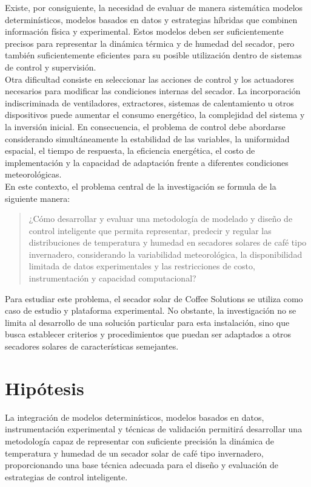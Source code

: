 Existe, por consiguiente, la necesidad de evaluar de manera sistemática modelos determinísticos, modelos basados en datos y estrategias híbridas que combinen información física y experimental. Estos modelos deben ser suficientemente precisos para representar la dinámica térmica y de humedad del secador, pero también suficientemente eficientes para su posible utilización dentro de sistemas de control y supervisión.\\

Otra dificultad consiste en seleccionar las acciones de control y los actuadores necesarios para modificar las condiciones internas del secador. La incorporación indiscriminada de ventiladores, extractores, sistemas de calentamiento u otros dispositivos puede aumentar el consumo energético, la complejidad del sistema y la inversión inicial. En consecuencia, el problema de control debe abordarse considerando simultáneamente la estabilidad de las variables, la uniformidad espacial, el tiempo de respuesta, la eficiencia energética, el costo de implementación y la capacidad de adaptación frente a diferentes condiciones meteorológicas.\\

En este contexto, el problema central de la investigación se formula de la siguiente manera:
\begin{quote}
¿Cómo desarrollar y evaluar una metodología de modelado y diseño de control inteligente que permita representar, predecir y regular las distribuciones de temperatura y humedad en secadores solares de café tipo invernadero, considerando la variabilidad meteorológica, la disponibilidad limitada de datos experimentales y las restricciones de costo, instrumentación y capacidad computacional?
\end{quote}

Para estudiar este problema, el secador solar de Coffee Solutions se utiliza como caso de estudio y plataforma experimental. No obstante, la investigación no se limita al desarrollo de una solución particular para esta instalación, sino que busca establecer criterios y procedimientos que puedan ser adaptados a otros secadores solares de características semejantes.


\section{Hipótesis}
\label{intro:hipotesis}
La integración de modelos determinísticos, modelos basados en datos, instrumentación experimental y técnicas de validación permitirá desarrollar una metodología capaz de representar con suficiente precisión la dinámica de temperatura y humedad de un secador solar de café tipo invernadero, proporcionando una base técnica adecuada para el diseño y evaluación de estrategias de control inteligente.


